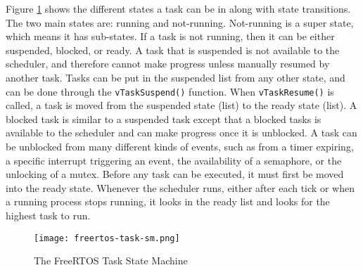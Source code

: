 Figure \ref{fig:freertos-task-sm} shows the different states a task can be in
along with state transitions. The two main states are: running and not-running.
Not-running is a super state, which means it has sub-states. If a task is not
running, then it can be either suspended, blocked, or ready. A task that is
suspended is not available to the scheduler, and therefore cannot make progress
unless manually resumed by another task. Tasks can be put in the suspended list
from any other state, and can be done through the \texttt{vTaskSuspend()} function. When
\texttt{vTaskResume()} is called, a task is moved from the suspended state (list) to the
ready state (list). A blocked task is similar to a suspended task except that a
blocked tasks is available to the scheduler and can make progress once it is
unblocked. A task can be unblocked from many different kinds of events, such as
from a timer expiring, a specific interrupt triggering an event, the
availability of a semaphore, or the unlocking of a mutex. Before any task can be
executed, it must first be moved into the ready state. Whenever the scheduler
runs, either after each tick or when a running process stops running, it looks
in the ready list and looks for the highest task to run.

\begin{figure}
\centering
\texttt{[image: freertos-task-sm.png]}
\caption{The FreeRTOS Task State Machine}
\label{fig:freertos-task-sm}
\end{figure}

